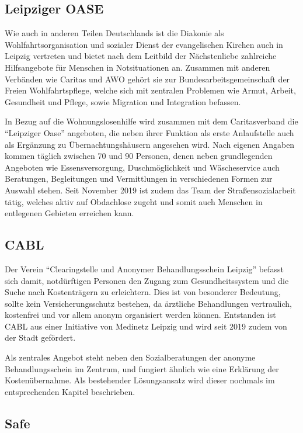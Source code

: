 \subsection{Leipziger OASE}

Wie auch in anderen Teilen Deutschlands ist die Diakonie als Wohlfahrtsorganisation und sozialer Dienst der evangelischen Kirchen auch in Leipzig vertreten und bietet nach dem Leitbild der Nächstenliebe zahlreiche Hilfsangebote für Menschen in Notsituationen an. Zusammen mit anderen Verbänden wie Caritas und AWO gehört sie zur Bundesarbeitsgemeinschaft der Freien Wohlfahrtspflege, welche sich mit zentralen Problemen wie Armut, Arbeit, Gesundheit und Pflege, sowie Migration und Integration befassen.

In Bezug auf die Wohnungslosenhilfe wird zusammen mit dem Caritasverband die \enquote{Leipziger Oase} angeboten, die neben ihrer Funktion als erste Anlaufstelle auch als Ergänzung zu Übernachtungshäusern angesehen wird. Nach eigenen Angaben kommen täglich zwischen 70 und 90 Personen, denen neben grundlegenden Angeboten wie Essensversorgung, Duschmöglichkeit und Wäscheservice auch Beratungen, Begleitungen und Vermittlungen in verschiedenen Formen zur Auswahl stehen. Seit November 2019 ist zudem das Team der Straßensozialarbeit tätig, welches aktiv auf Obdachlose zugeht und somit auch Menschen in entlegenen Gebieten erreichen kann. \citep{Diakonie}

\subsection{CABL}

Der Verein \enquote{Clearingstelle und Anonymer Behandlungsschein Leipzig} befasst sich damit, notdürftigen Personen den Zugang zum Gesundheitssystem und die Suche nach Kostenträgern zu erleichtern. Dies ist von besonderer Bedeutung, sollte kein Versicherungsschutz bestehen, da ärztliche Behandlungen vertraulich, kostenfrei und vor allem anonym organisiert werden können. Entstanden ist CABL aus einer Initiative von Medinetz Leipzig und wird seit 2019 zudem von der Stadt gefördert.

Als zentrales Angebot steht neben den Sozialberatungen der anonyme Behandlungsschein im Zentrum, und fungiert ähnlich wie eine Erklärung der Kostenübernahme. Als bestehender Lösungsansatz wird dieser nochmals im entsprechenden Kapitel beschrieben. \citep{CABL}


\subsection{Safe}

